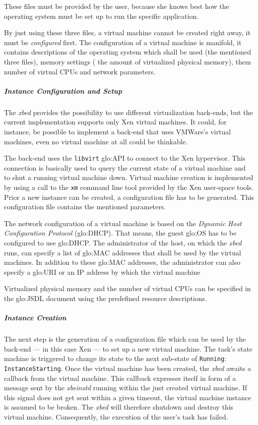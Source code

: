 These files must  be provided by the user, because she  knows best how the
operating system must be set up to run the specific application.

By just using these three files, a virtual machine cannot be created right
away, it must be \emph{configured}  first.  The configuration of a virtual
machine  is manifold,  it contains  descriptions of  the  operating system
which shall be used (\ie  the mentioned three files), memory settings (\ie
the amount  of virtualized physical  memory), them number of  virtual CPUs
and network parameters.

\subparagraph{Instance Configuration and Setup}

The \emph{xbed}  provides the possibility to  use different virtualization
back-ends,  but  the  current  implementation supports  only  Xen  virtual
machines. It could, for instance, be possible to implement a back-end that
uses VMWare's  \cite{vmware} virtual machines, even no  virtual machine at
all could be thinkable.

The back-end uses  the \texttt{libvirt} \gls{glo:API} to connect
to  the Xen hypervisor.  This connection  is basically  used to  query the
current state of  a virtual machine and to shut  a running virtual machine
down.   Virtual machine creation  is implemented  by using  a call  to the
\texttt{xm} command line tool provided by the Xen user-space tools.  Prior
a  new  instance   can  be  created,  a  configuration   file  has  to  be
generated. This configuration file contains the mentioned parameters.

The  network  configuration   of  a  virtual  machine  is   based  on  the
\emph{Dynamic Host Configuration  Protocol} (\gls{glo:DHCP}).  That means,
the guest  \gls{glo:OS} has  to be configured  to use  \gls{glo:DHCP}. The
administrator of  the host, on which  the \emph{xbed} runs,  can specify a
list  of  \gls{glo:MAC}  addresses  that  shall be  used  by  the  virtual
machines. In addition to  these \gls{glo:MAC} addresses, the administrator
can also  specify a \gls{glo:URI}  or an IP  address by which  the virtual
machine

Virtualized  physical  memory  and  the  number of  virtual  CPUs  can  be
specified  in the  \gls{glo:JSDL} document  using the  predefined resource
descriptions.

\subparagraph{Instance Creation}

The next step is the generation  of a configuration file which can be used
by the back-end --- in this case  Xen --- to set up a new virtual machine.
The task's  state machine  is triggered  to change its  state to  the next
sub-state   of  \texttt{Running}:  \texttt{InstanceStarting}.    Once  the
virtual machine has  been created, the \emph{xbed} awaits  a callback from
the virtual machine.  This callback  expresses itself in form of a message
sent  by  the \emph{xbeinstd}  running  within  the  just created  virtual
machine.  If  this signal does  not get sent  within a given  timeout, the
virtual machine  instance is  assumed to be  broken. The  \emph{xbed} will
therefore shutdown  and destroy  this virtual machine.   Consequently, the
execution  of the  user's task  has  failed.

